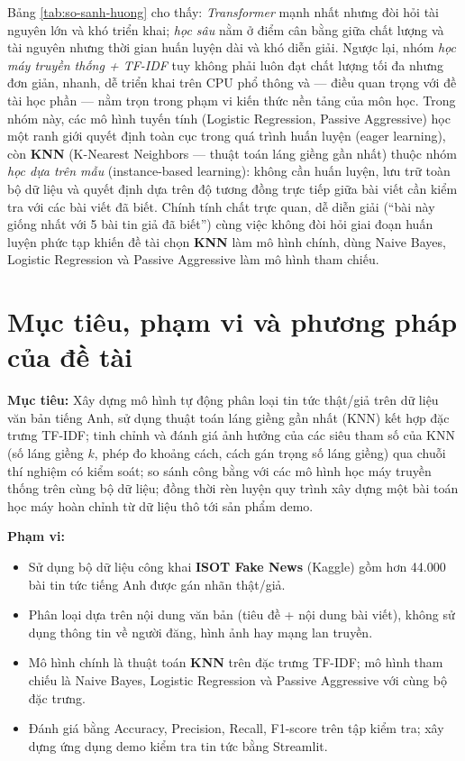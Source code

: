 Bảng \ref{tab:so-sanh-huong} cho thấy: \textit{Transformer} mạnh nhất nhưng đòi hỏi tài nguyên lớn và khó triển khai; \textit{học sâu} nằm ở điểm cân bằng giữa chất lượng và tài nguyên nhưng thời gian huấn luyện dài và khó diễn giải. Ngược lại, nhóm \textit{học máy truyền thống + TF-IDF} tuy không phải luôn đạt chất lượng tối đa nhưng đơn giản, nhanh, dễ triển khai trên CPU phổ thông và --- điều quan trọng với đề tài học phần --- nằm trọn trong phạm vi kiến thức nền tảng của môn học. Trong nhóm này, các mô hình tuyến tính (Logistic Regression, Passive Aggressive) học một ranh giới quyết định toàn cục trong quá trình huấn luyện (eager learning), còn \textbf{KNN} (K-Nearest Neighbors --- thuật toán láng giềng gần nhất) thuộc nhóm \textit{học dựa trên mẫu} (instance-based learning): không cần huấn luyện, lưu trữ toàn bộ dữ liệu và quyết định dựa trên độ tương đồng trực tiếp giữa bài viết cần kiểm tra với các bài viết đã biết. Chính tính chất trực quan, dễ diễn giải (``bài này giống nhất với 5 bài tin giả đã biết'') cùng việc không đòi hỏi giai đoạn huấn luyện phức tạp khiến đề tài chọn \textbf{KNN} làm mô hình chính, dùng Naive Bayes, Logistic Regression và Passive Aggressive làm mô hình tham chiếu.

\section{Mục tiêu, phạm vi và phương pháp của đề tài}

\textbf{Mục tiêu:} Xây dựng mô hình tự động phân loại tin tức thật/giả trên dữ liệu văn bản tiếng Anh, sử dụng thuật toán láng giềng gần nhất (KNN) kết hợp đặc trưng TF-IDF; tinh chỉnh và đánh giá ảnh hưởng của các siêu tham số của KNN (số láng giềng $k$, phép đo khoảng cách, cách gán trọng số láng giềng) qua chuỗi thí nghiệm có kiểm soát; so sánh công bằng với các mô hình học máy truyền thống trên cùng bộ dữ liệu; đồng thời rèn luyện quy trình xây dựng một bài toán học máy hoàn chỉnh từ dữ liệu thô tới sản phẩm demo.

\textbf{Phạm vi:}
\begin{itemize}
    \item Sử dụng bộ dữ liệu công khai \textbf{ISOT Fake News} \cite{dataset} (Kaggle) gồm hơn 44.000 bài tin tức tiếng Anh được gán nhãn thật/giả.
    \item Phân loại dựa trên nội dung văn bản (tiêu đề + nội dung bài viết), không sử dụng thông tin về người đăng, hình ảnh hay mạng lan truyền.
    \item Mô hình chính là thuật toán \textbf{KNN} trên đặc trưng TF-IDF; mô hình tham chiếu là Naive Bayes, Logistic Regression và Passive Aggressive với cùng bộ đặc trưng.
    \item Đánh giá bằng Accuracy, Precision, Recall, F1-score trên tập kiểm tra; xây dựng ứng dụng demo kiểm tra tin tức bằng Streamlit.
\end{itemize}

